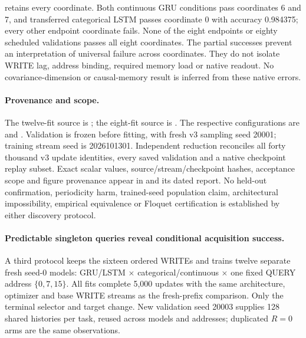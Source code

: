  retains every coordinate. Both continuous GRU
conditions pass coordinates 6 and 7, and transferred categorical LSTM passes
coordinate 0 with accuracy 0.984375; every other endpoint coordinate fails.
None of the eight endpoints or eighty scheduled validations passes all eight
coordinates. The partial successes prevent an interpretation of universal
failure across coordinates. They do not isolate WRITE lag, address binding,
required memory load or native readout. No covariance-dimension or causal-memory
result is inferred from these native errors.

\paragraph{Provenance and scope.}
The twelve-fit source is
; the eight-fit source is
.
The respective configurations are
 and
.
Validation is frozen before fitting, with fresh v3 sampling seed 20001;
training stream seed is 2026101301. Independent reduction reconciles all
forty thousand v3 update identities, every saved validation and a native
checkpoint replay subset. Exact scalar values, source/stream/checkpoint
hashes, acceptance scope and figure provenance appear in
 and its dated report.
No held-out confirmation, periodicity harm, trained-seed population claim,
architectural impossibility, empirical equivalence or Floquet certification
is established by either discovery protocol.

\paragraph{Predictable singleton queries reveal conditional acquisition success.}
A third protocol keeps the sixteen ordered WRITEs and trains twelve separate
fresh seed-0 models: GRU/LSTM $\times$ categorical/continuous $\times$ one
fixed QUERY address $\{0,7,15\}$. All fits complete 5,000 updates with the
same architecture, optimizer and base WRITE streams as the fresh-prefix
comparison. Only the terminal selector and target change. New validation
seed 20003 supplies 128 shared histories per task, reused across models and
addresses; duplicated $R=0$ arms are the same observations.

